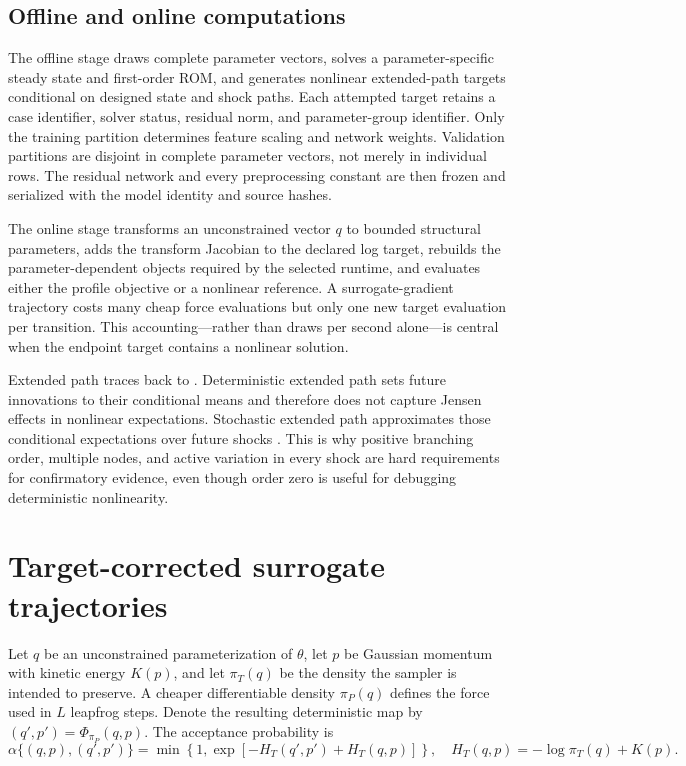 \documentclass[11pt]{article}
\begin{document}
\subsection{Offline and online computations}

The offline stage draws complete parameter vectors, solves a parameter-specific
steady state and first-order ROM, and generates nonlinear extended-path targets
conditional on designed state and shock paths. Each attempted target retains a
case identifier, solver status, residual norm, and parameter-group identifier.
Only the training partition determines feature scaling and network weights.
Validation partitions are disjoint in complete parameter vectors, not merely in
individual rows. The residual network and every preprocessing constant are
then frozen and serialized with the model identity and source hashes.

The online stage transforms an unconstrained vector $q$ to bounded structural
parameters, adds the transform Jacobian to the declared log target, rebuilds
the parameter-dependent objects required by the selected runtime, and evaluates
either the profile objective or a nonlinear reference. A surrogate-gradient
trajectory costs many cheap force evaluations but only one new target
evaluation per transition. This accounting---rather than draws per second
alone---is central when the endpoint target contains a nonlinear solution.

Extended path traces back to \citet{fair1983extended}. Deterministic extended
path sets future innovations to their conditional means and therefore does not
capture Jensen effects in nonlinear expectations. Stochastic extended path
approximates those conditional expectations over future shocks
\citep{adjemian2025sep}. This is why positive branching order, multiple nodes,
and active variation in every shock are hard requirements for confirmatory
evidence, even though order zero is useful for debugging deterministic
nonlinearity.

\section{Target-corrected surrogate trajectories}

Let $q$ be an unconstrained parameterization of $\theta$, let $p$ be Gaussian
momentum with kinetic energy $K(p)$, and let $\pi_T(q)$ be the density the
sampler is intended to preserve. A cheaper differentiable density $\pi_P(q)$
defines the force used in $L$ leapfrog steps. Denote the resulting deterministic
map by $(q',p')=\Phi_{\pi_P}(q,p)$. The acceptance probability is
\begin{equation}
  \alpha\{(q,p),(q',p')\}
  =\min\left\{1,
  \exp\left[-H_T(q',p')+H_T(q,p)\right]\right\},
  \quad
  H_T(q,p)=-\log\pi_T(q)+K(p).
  \label{eq:acceptance}
\end{equation}
\end{document}
